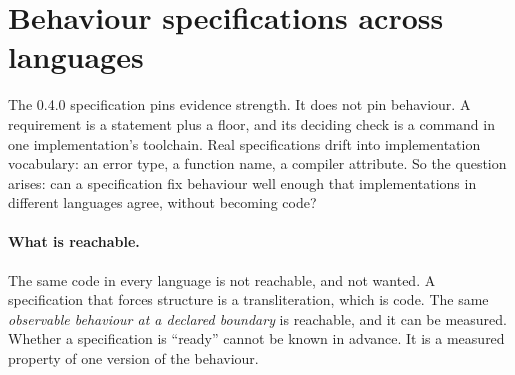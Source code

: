 \documentclass[11pt]{article}
\theoremstyle{definition}
\theoremstyle{remark}
\begin{document}
\section{Behaviour specifications across languages}\label{sec:behaviour}

The 0.4.0 specification pins evidence strength. It does not pin behaviour. A requirement is a
statement plus a floor, and its deciding check is a command in one implementation's toolchain.
Real specifications drift into implementation vocabulary: an error type, a function name, a
compiler attribute. So the question arises: can a specification fix behaviour well enough that
implementations in different languages agree, without becoming code?

\paragraph{What is reachable.} The same code in every language is not reachable, and not wanted.
A specification that forces structure is a transliteration, which is code. The same
\emph{observable behaviour at a declared boundary} is reachable, and it can be measured. Whether
a specification is ``ready'' cannot be known in advance. It is a measured property of one version
of the behaviour.
\end{document}
